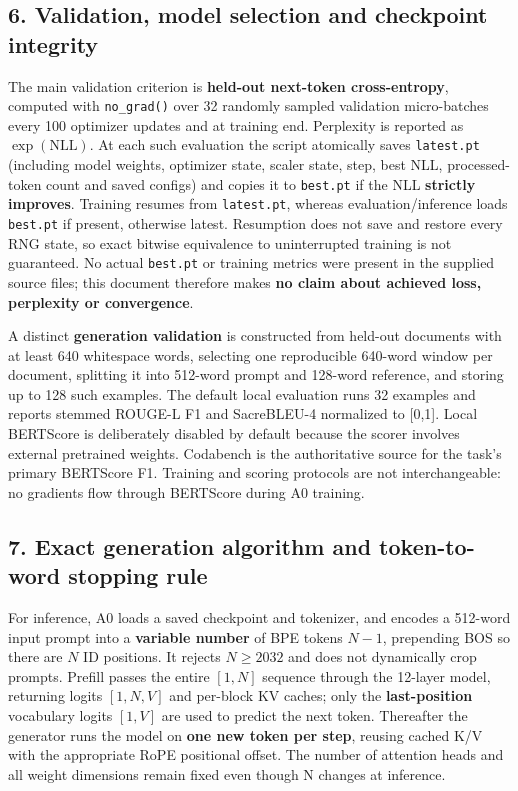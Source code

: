 \subsection{6. Validation, model selection and checkpoint
integrity}\label{validation-model-selection-and-checkpoint-integrity}

The main validation criterion is \textbf{held-out next-token
cross-entropy}, computed with \texttt{no\_grad()} over 32 randomly
sampled validation micro-batches every 100 optimizer updates and at
training end. Perplexity is reported as \(\exp(\mathrm{NLL})\). At each
such evaluation the script atomically saves \texttt{latest.pt}
(including model weights, optimizer state, scaler state, step, best NLL,
processed-token count and saved configs) and copies it to
\texttt{best.pt} if the NLL \textbf{strictly improves}. Training resumes
from \texttt{latest.pt}, whereas evaluation/inference loads
\texttt{best.pt} if present, otherwise latest. Resumption does not save
and restore every RNG state, so exact bitwise equivalence to
uninterrupted training is not guaranteed. No actual \texttt{best.pt} or
training metrics were present in the supplied source files; this
document therefore makes \textbf{no claim about achieved loss,
perplexity or convergence}.

A distinct \textbf{generation validation} is constructed from held-out
documents with at least 640 whitespace words, selecting one reproducible
640-word window per document, splitting it into 512-word prompt and
128-word reference, and storing up to 128 such examples. The default
local evaluation runs 32 examples and reports stemmed ROUGE-L F1 and
SacreBLEU-4 normalized to {[}0,1{]}. Local BERTScore is deliberately
disabled by default because the scorer involves external pretrained
weights. Codabench is the authoritative source for the task's primary
BERTScore F1. Training and scoring protocols are not interchangeable: no
gradients flow through BERTScore during A0 training.

\subsection{7. Exact generation algorithm and token-to-word stopping
rule}\label{exact-generation-algorithm-and-token-to-word-stopping-rule}

For inference, A0 loads a saved checkpoint and tokenizer, and encodes a
512-word input prompt into a \textbf{variable number} of BPE tokens
\(N-1\), prepending BOS so there are \(N\) ID positions. It rejects
\(N\ge2032\) and does not dynamically crop prompts. Prefill passes the
entire \([1,N]\) sequence through the 12-layer model, returning logits
\([1,N,V]\) and per-block KV caches; only the \textbf{last-position}
vocabulary logits \([1,V]\) are used to predict the next token.
Thereafter the generator runs the model on \textbf{one new token per
step}, reusing cached K/V with the appropriate RoPE positional offset.
The number of attention heads and all weight dimensions remain fixed
even though N changes at inference.

